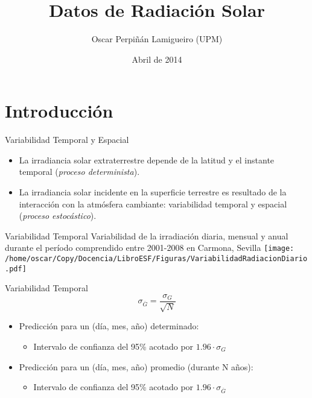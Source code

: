 \documentclass[xcolor={usenames,svgnames,dvipsnames}]{beamer}
\author{Oscar Perpiñán Lamigueiro (UPM)}
\date{Abril de 2014}
\title{Datos de Radiación Solar}
\begin{document}
\maketitle



\section{Introducción}
\label{sec-1}

\begin{frame}[label=sec-1-1]{Variabilidad Temporal y Espacial}
\begin{itemize}
\item La irradiancia solar extraterrestre depende de la latitud y el instante temporal (\emph{proceso determinista}).
\item La irradiancia solar incidente en la superficie terrestre es resultado de la interacción con la atmósfera cambiante: \alert{variabilidad temporal y espacial} (\emph{proceso estocástico}).
\end{itemize}
\end{frame}
\begin{frame}[label=sec-1-2]{Variabilidad Temporal}
Variabilidad de la irradiación diaria, mensual y anual durante el período comprendido entre 2001-2008 en Carmona, Sevilla
\texttt{[image: /home/oscar/Copy/Docencia/LibroESF/Figuras/VariabilidadRadiacionDiario.pdf]}

\nocite{Perpinan2009}
\end{frame}
\begin{frame}[label=sec-1-3]{Variabilidad Temporal}
\[
\sigma_{\overline{G}}=\frac{\sigma_{G}}{\sqrt{N}}
\]

\begin{itemize}
\item Predicción para un (día, mes, año) \alert{determinado}: 

\begin{itemize}
\item Intervalo de confianza del 95\% acotado por $1.96\cdot\sigma_{G}$
\end{itemize}

\item Predicción para un (día, mes, año) \alert{promedio (durante N años)}: 

\begin{itemize}
\item Intervalo de confianza del 95\% acotado por $1.96\cdot\sigma_{\overline{G}}$
\end{itemize}
\end{itemize}
\end{frame}
\end{document}
